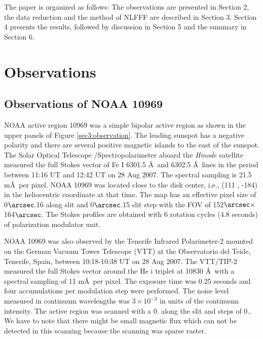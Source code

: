 \documentclass[manuscript]{aastex61}
\begin{document}
The paper is organized as follows: The observations are presented in Section 2,  the data
reduction  and the method of NLFFF are described in Section 3. Section 4 presents the results, followed
by discussion in Section 5 and the summary in Section 6.


\section{Observations}
 
 \subsection{Observations of NOAA 10969}
NOAA active region 10969 was a simple bipolar active region as shown in the upper panels of Figure \ref{sec3:observation}.
The leading sunspot has a negative polarity and there are several positive magnetic  islands to the east of the sunspot.
 The Solar Optical Telescope \citep[SOT;][]{2008SoPh..249..167T,2008SoPh..249..221S,2008SoPh..249..197S,2008SoPh..249..233I}/Spectropolarimeter \citep[SP;][]{2013SoPh..283..579L}  aboard the {\it Hinode} satellite  \citep{2007SoPh..243....3K} measured the full Stokes vector of Fe {\sc I} 6301.5 \AA \ and 6302.5 \AA \ lines in the period between 11:16 UT and 12:42 UT on 28 Aug 2007.
 The spectral sampling is 21.5 m\AA \ per pixel.
 NOAA 10969 was located close to the disk center, i.e., (111 \arcsec, -184\arcsec) in the heliocentric coordinate at that time. 
 The map has an effective pixel size of 0$\arcsec$.16 along slit and 0$\arcsec$.15 slit step with the FOV of 152$\arcsec \times$164$\arcsec$. 
 The Stokes profiles are obtained with 6 rotation cycles (4.8 seconds) of polarization modulator unit.

  
NOAA 10969 was also observed by the Tenerife Infrared Polarimeter-2
\cite[TIP-2;][]{2007ASPC..368..611C} mounted on the German Vacuum Tower
Telescope (VTT) at the Observatorio del Teide, Tenerife, Spain, between 10:18-10:38
UT on 28 Aug 2007. The VTT/TIP-2 measured the full Stokes vector around the He {\sc i}
triplet at 10830 \AA \ with a spectral sampling of 11 m\AA \ per pixel. 
The exposure time was 0.25 seconds and four accumulations per modulation step were
performed. The noise level measured in continuum wavelengths was $3\times10^{-3}$ in units
of the continuum intensity. 
The active region was scanned with a 0. along the slit and steps of 0.. 
We have to note that there might be small magnetic flux which can not be detected in this scanning because the scanning was sparse raster.
\end{document}
